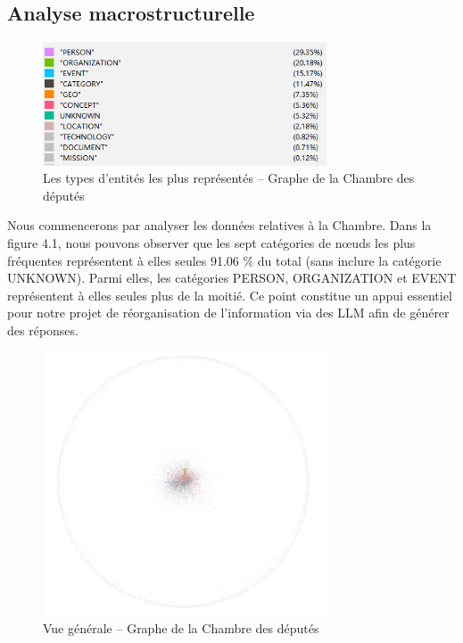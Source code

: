 \documentclass[a4paper,twoside,12pt]{book}
\begin{document}
\subsection{Analyse macrostructurelle}

\begin{figure}
\centering %
\includegraphics[width=0.75\textwidth]{img/chambre_entity_type.png}
\caption{Les types d'entités les plus représentés – Graphe de la Chambre des députés}
\end{figure}

Nous commencerons par analyser les données relatives à la Chambre. Dans la figure 4.1, nous pouvons observer que les sept catégories de nœuds les plus fréquentes représentent à elles seules 91.06 \% du total (sans inclure la catégorie UNKNOWN). Parmi elles, les catégories PERSON, ORGANIZATION et EVENT représentent à elles seules plus de la moitié. Ce point constitue un appui essentiel pour notre projet de réorganisation de l'information via des LLM afin de générer des réponses.




\begin{figure}
\centering %
\includegraphics[width=0.75\textwidth]{img/chambre_general_view.png}
\caption{Vue générale – Graphe de la Chambre des députés}
\end{figure}
\end{document}
